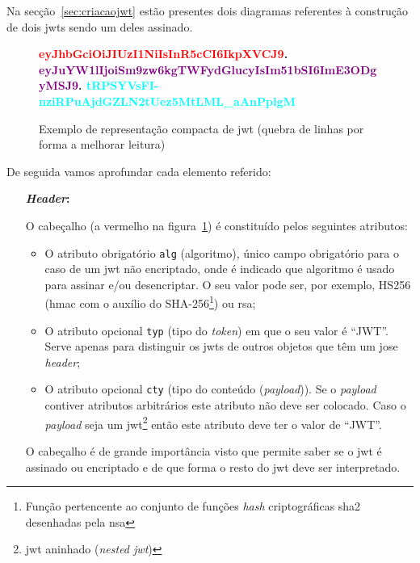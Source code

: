 Na secção~\ref{sec:criacaojwt} estão presentes dois diagramas referentes à construção de dois \acrshort{jwt}s 
sendo um deles assinado.

\begin{figure}[H]
    \centering
    \textbf{\textcolor{red}{eyJhbGciOiJIUzI1NiIsInR5cCI6IkpXVCJ9}.
        \textcolor{purple}{eyJuYW1lIjoiSm9zw6kgTWFydGlucyIsIm51bSI6ImE3ODgyMSJ9}.
        \textcolor{cyan}{tRPSYVsFI-nziRPuAjdGZLN2tUez5MtLML\_aAnPplgM}
    }
    \caption{Exemplo de representação compacta de \acrshort{jwt} (quebra de linhas por forma a melhorar leitura)}\label{fig:exemjwt}
\end{figure}

De seguida vamos aprofundar cada elemento referido:
\begin{itemize}
    \item[\textbf{\textit{Header}:}]

    O cabeçalho (a vermelho na figura~\ref{fig:exemjwt}) é constituído pelos seguintes atributos:
    \begin{itemize}
        \item O atributo obrigatório \texttt{alg} (algoritmo), único campo obrigatório para o caso de um 
        \acrshort{jwt} não encriptado, 
         onde é indicado que algoritmo é usado para assinar e/ou desencriptar. 
        O seu valor pode ser, por exemplo, HS256 (\acrshort{hmac} com o auxílio do 
        SHA-256\footnote{Função pertencente ao conjunto de funções \textit{hash} criptográficas 
        \acrfull{sha2} desenhadas pela \acrshort{nsa}}) ou \acrshort{rsa};
        \item O atributo opcional \texttt{typ} (tipo do \textit{token}) em que o seu valor é ``JWT''. 
        Serve apenas para distinguir os \acrshort{jwt}s de outros objetos que têm um \acrshort{jose} 
        \textit{header};
        \item O atributo opcional \texttt{cty} (tipo do conteúdo (\textit{payload})). 
        Se o \textit{payload} contiver atributos arbitrários este atributo não deve ser colocado. 
        Caso o \textit{payload} seja um \acrshort{jwt}\footnote{\acrshort{jwt} aninhado 
        (\textit{nested \acrshort{jwt}})} então este atributo deve ter o valor de ``JWT''.
    \end{itemize}

    O cabeçalho é de grande importância visto que permite saber se o \acrshort{jwt} é assinado ou encriptado e de 
    que forma o resto do \acrshort{jwt} deve ser interpretado.


\end{itemize}
